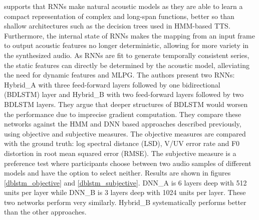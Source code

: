 \documentclass[a4paper, oneside]{article}
\begin{document}
\citep{BDLSTMTTS} supports that RNNs make natural acoustic models as they are able to learn a compact representation of complex and long-span functions, better so than shallow architectures such as the decision trees used in HMM-based TTS. Furthermore, the internal state of RNNs makes the mapping from an input frame to output acoustic features no longer deterministic, allowing for more variety in the synthesized audio. As RNNs are fit to generate temporally consistent series, the static features can directly be determined by the acoustic model, alleviating the need for dynamic features and MLPG. The authors present two RNNs: Hybrid\_A with three feed-forward layers followed by one bidirectional (BDLSTM) layer and Hybrid\_B with two feed-forward layers followed by two BDLSTM layers. They argue that deeper structures of BDLSTM would worsen the performance due to imprecise gradient computation. They compare these networks against the HMM and DNN based approaches described previously, using objective and subjective measures. The objective measures are compared with the ground truth: log spectral distance (LSD), V/UV error rate and F0 distortion in root mean squared error (RMSE). The subjective measure is a preference test where participants choose between two audio samples of different models and have the option to select neither. Results are shown in figures \ref{dblstm_objective} and \ref{dblstm_subjective}. DNN\_A is 6 layers deep with 512 units per layer while DNN\_B is 3 layers deep with 1024 units per layer. These two networks perform very similarly. Hybrid\_B systematically performs better than the other approaches.

\end{document}
